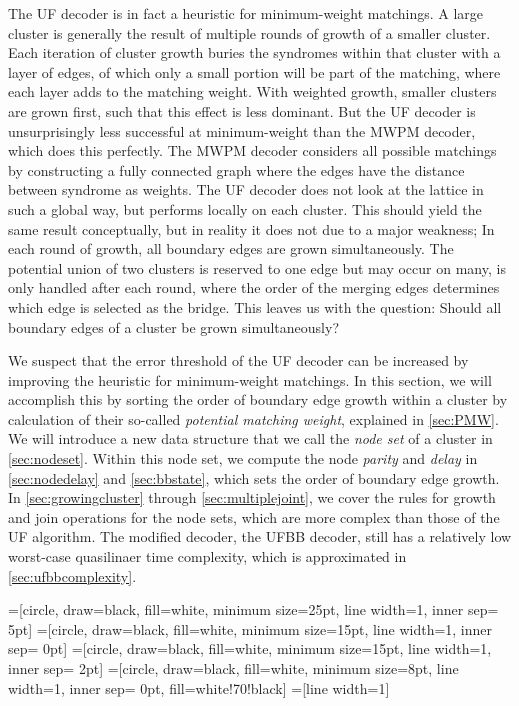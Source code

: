 The UF decoder is in fact a heuristic for minimum-weight matchings. A large cluster is generally the result of multiple rounds of growth of a smaller cluster. Each iteration of cluster growth buries the syndromes within that cluster with a layer of edges, of which only a small portion will be part of the matching, where each layer adds to the matching weight. With weighted growth, smaller clusters are grown first, such that this effect is less dominant. But the UF decoder is unsurprisingly less successful at minimum-weight than the MWPM decoder, which does this perfectly. The MWPM decoder considers all possible matchings by constructing a fully connected graph where the edges have the distance between syndrome as weights. The UF decoder does not look at the lattice in such a global way, but performs locally on each cluster. This should yield the same result conceptually, but in reality it does not due to a major weakness; In each round of growth, all boundary edges are grown simultaneously. The potential union of two clusters is reserved to one edge but may occur on many, is only handled after each round, where the order of the merging edges determines which edge is selected as the bridge. This leaves us with the question: Should all boundary edges of a cluster be grown simultaneously?

We suspect that the error threshold of the UF decoder can be increased by improving the heuristic for minimum-weight matchings. In this section, we will accomplish this by sorting the order of boundary edge growth within a cluster by calculation of their so-called \emph{potential matching weight}, explained in \ref{sec:PMW}. We will introduce a new data structure that we call the \emph{node set} of a cluster in \ref{sec:nodeset}. Within this node set, we compute the node \emph{parity} and \emph{delay} in \ref{sec:nodedelay} and \ref{sec:bbstate}, which sets the order of boundary edge growth. In \ref{sec:growingcluster} through \ref{sec:multiplejoint}, we cover the rules for growth and join operations for the node sets, which are more complex than those of the UF algorithm. The modified decoder, the UFBB decoder, still has a relatively low worst-case quasilinaer time complexity, which is approximated in \ref{sec:ufbbcomplexity}.


=[circle, draw=black, fill=white, minimum size=25pt, line width=1, inner sep= 5pt]
=[circle, draw=black, fill=white, minimum size=15pt, line width=1, inner sep= 0pt]
=[circle, draw=black, fill=white, minimum size=15pt, line width=1, inner sep= 2pt]
=[circle, draw=black, fill=white, minimum size=8pt, line width=1, inner sep= 0pt, fill=white!70!black]
=[line width=1]
\tikzfading[name=fade right, left color=transparent!0, right color=transparent!100]


